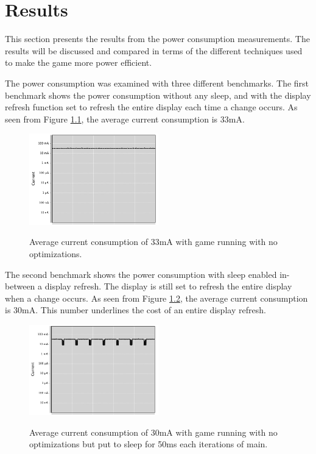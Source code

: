 \chapter{Results}
This section presents the results from the power consumption measurements. The results will be discussed and compared in terms of the different techniques used to make the game more power efficient.

The power consumption was examined with three different benchmarks. The first benchmark shows the power consumption without any sleep, and with the display refresh function set to refresh the entire display each time a change occurs. As seen from Figure \ref{fig:no_opt}, the average current consumption is 33mA.

\begin{figure}[h]
\centering
\includegraphics[width=0.5\textwidth]{images/welcome_no_opt.png}
\label{fig:no_opt}
\caption{Average current consumption of 33mA with game running with no optimizations.}
\end{figure}

The second benchmark shows the power consumption with sleep enabled in-between a display refresh. The display is still set to refresh the entire display when a change occurs. As seen from Figure \ref{fig:sleep}, the average current consumption is 30mA. This number underlines the cost of an entire display refresh.  

\begin{figure}[h]
\centering
\includegraphics[width=0.5\textwidth]{images/welcome_sleep.png}
\label{fig:sleep}
\caption{Average current consumption of 30mA with game running with no optimizations but put to sleep for 50ms each iterations of main.}
\end{figure}

